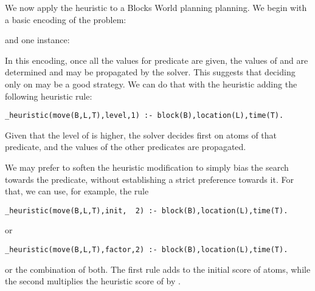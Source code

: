 \begin{example}
\label{example:blocks:world:heuristic}
We now apply the  heuristic to a Blocks World planning planning.  
We begin with a basic encoding of the problem:

and one instance:

%
In this encoding, once all the values for predicate  are given,
the values of  and  are determined and may be propagated by the solver.
This suggests that deciding only on  may be a good strategy.
We can do that with the  heuristic 
adding the following heuristic rule:

\begin{lstlisting}[basicstyle=\small\ttfamily,numbers=none]
_heuristic(move(B,L,T),level,1) :- block(B),location(L),time(T).
\end{lstlisting}
Given that the level of  is higher,  the solver 
decides first on atoms of that predicate,
and the values of the other predicates are propagated.

We may prefer to soften the heuristic modification to simply bias the search  towards the  predicate,
without establishing a strict preference towards it.  
For that, we can use, for example, the rule
\begin{lstlisting}[basicstyle=\small\ttfamily,numbers=none]
_heuristic(move(B,L,T),init,  2) :- block(B),location(L),time(T).
\end{lstlisting} 
or
\begin{lstlisting}[basicstyle=\small\ttfamily,numbers=none]
_heuristic(move(B,L,T),factor,2) :- block(B),location(L),time(T).
\end{lstlisting}
or the combination of both.  
The first rule adds  to the initial score of  atoms,
while the second multiplies the heuristic score of  by .


\end{example}
